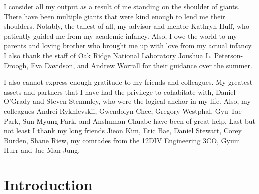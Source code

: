 \documentclass{report}
\begin{document}
I consider all my output as a result of me standing on the shoulder
of giants. There have been multiple giants that were kind enough
to lend me their shoulders. Notably, the tallest of all, my advisor
and mentor Kathryn Huff, who patiently guided me from my academic
infancy. Also, I owe the world to my parents and loving brother who
brought me up with love
from my actual infancy.  I also thank the staff of Oak Ridge National Laboratory
Joushua L. Peterson-Droogh, Eva Davidson, and Andrew Worrall for their
guidance over the summer.

I also cannot express enough gratitude to my friends and colleagues. My greatest
assets and partners that I have had the privilege to cohabitate with, Daniel
O'Grady and Steven Stemmley, who were the logical anchor in my life. Also, my colleagues
Andrei Rykhlevskii, Gwendolyn Chee, Gregory Westphal, Gyu Tae Park, Sun Myung Park, and
Anshuman Chuabe have been of great help. Last but not least I thank my long friends Jieon Kim,
Eric Bae, Daniel Stewart, Corey Burden, Shane Riew, my comrades from the 12DIV Engineering 3CO, Gyum Hurr and Jae Man Jung.



\tableofcontents
\listoftables
\listoffigures


\pagebreak

\chapter{Introduction}

\end{document}
